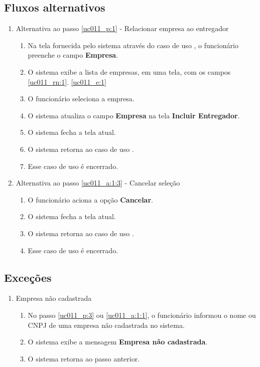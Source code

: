 \subsection{Fluxos alternativos}

\begin{enumerate}[label=A\arabic*]
	\item Alternativa ao passo \ref{uc011_p:1} - Relacionar empresa ao entregador \label{uc011_a:1}
	\begin{enumerate}[label*=.\arabic*]
		\item Na tela fornecida pelo sistema através do caso de uso , o funcionário preenche o campo \textbf{Empresa}. \label{uc011_a:1:1}
		\item O sistema exibe a lista de empresas, em uma tela, com os campos \ref{uc011_rn:1}. \ref{uc011_e:1}
		\item O funcionário seleciona a empresa. \label{uc011_a:1:3}
		\item O sistema atualiza o campo \textbf{Empresa} na tela \textbf{Incluir Entregador}.
		\item O sistema fecha a tela atual.
		\item O sistema retorna ao caso de uso .
		\item Esse caso de uso é encerrado.
	\end{enumerate}
	
	\item Alternativa ao passo \ref{uc011_a:1:3} - Cancelar seleção
	\begin{enumerate}[label*=.\arabic*]
		\item O funcionário aciona a opção \textbf{Cancelar}.
		\item O sistema fecha a tela atual.
		\item O sistema retorna ao caso de uso .
		\item Esse caso de uso é encerrado.
	\end{enumerate}
\end{enumerate}

\subsection{Exceções}

\begin{enumerate}[label=E\arabic*]
	\item Empresa não cadastrada \label{uc011_e:1}
	\begin{enumerate}[label*=.\arabic*]
		\item[] No passo \ref{uc011_p:3} ou \ref{uc011_a:1:1}, o funcionário informou o nome ou CNPJ de uma empresa não cadastrada no sistema.
		\item O sistema exibe a mensagem \textbf{Empresa não cadastrada}.
		\item O sistema retorna ao passo anterior.
	\end{enumerate}
\end{enumerate}

